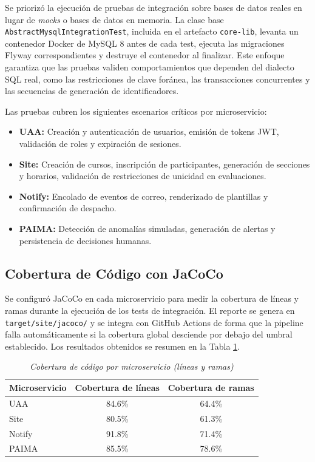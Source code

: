 Se priorizó la ejecución de pruebas de integración sobre bases de datos reales en
lugar de \textit{mocks} o bases de datos en memoria. La clase base
\texttt{AbstractMysqlIntegrationTest}, incluida en el artefacto \texttt{core-lib},
levanta un contenedor Docker de MySQL 8 antes de cada test, ejecuta las migraciones
Flyway correspondientes y destruye el contenedor al finalizar. Este enfoque garantiza
que las pruebas validen comportamientos que dependen del dialecto SQL real, como las
restricciones de clave foránea, las transacciones concurrentes y las secuencias de
generación de identificadores.

Las pruebas cubren los siguientes escenarios críticos por microservicio:

\begin{itemize}
    \item \textbf{UAA:} Creación y autenticación de usuarios, emisión de tokens JWT,
    validación de roles y expiración de sesiones.
    \item \textbf{Site:} Creación de cursos, inscripción de participantes,
    generación de secciones y horarios, validación de restricciones de unicidad
    en evaluaciones.
    \item \textbf{Notify:} Encolado de eventos de correo, renderizado de plantillas
    y confirmación de despacho.
    \item \textbf{PAIMA:} Detección de anomalías simuladas, generación de alertas
    y persistencia de decisiones humanas.
\end{itemize}

\subsection{Cobertura de Código con JaCoCo}

Se configuró JaCoCo en cada microservicio para medir la cobertura de líneas y ramas
durante la ejecución de los tests de integración. El reporte se genera en
\texttt{target/site/jacoco/} y se integra con GitHub Actions de forma que la pipeline
falla automáticamente si la cobertura global desciende por debajo del umbral
establecido. Los resultados obtenidos se resumen en la Tabla
\ref{tab:cobertura-jacoco}.

\begin{table}[ht!]
\centering
{}
\begin{tabular}{lcc}
\toprule
\textbf{Microservicio} & \textbf{Cobertura de líneas} & \textbf{Cobertura de ramas} \\
\midrule
UAA & 84.6\% & 64.4\% \\
Site & 80.5\% & 61.3\% \\
Notify & 91.8\% & 71.4\% \\
PAIMA & 85.5\% & 78.6\% \\
\bottomrule
\end{tabular}
\caption{\textit{Cobertura de código por microservicio (líneas y ramas)}}
\label{tab:cobertura-jacoco}
\end{table}

